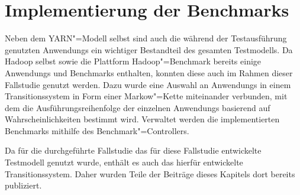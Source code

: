 \chapter{Implementierung der Benchmarks}
\label{ch:benchmarks}

Neben dem \gls{YARN}"=Modell selbst sind auch die während der Testausführung genutzten \glspl{Anwendung} ein wichtiger Bestandteil des gesamten Testmodells.
Da Hadoop selbst sowie die Plattform Hadoop"=Benchmark bereits einige \glspl{Anwendung} und Benchmarks enthalten, konnten diese auch im Rahmen dieser Fallstudie genutzt werden.
Dazu wurde eine Auswahl an \glspl{Anwendung} in einem Transitionssystem in Form einer Markow"=Kette miteinander verbunden, mit dem die Ausführungsreihenfolge der einzelnen \glspl{Anwendung} basierend auf Wahrscheinlichkeiten bestimmt wird.
Verwaltet werden die implementierten Benchmarks mithilfe des Benchmark"=Controllers.

Da für die durchgeführte Fallstudie \cite{Eberhardinger2018} das für diese Fallstudie entwickelte Testmodell genutzt wurde, enthält es auch das hierfür entwickelte Transitionssystem.
Daher wurden Teile der Beiträge dieses Kapitels dort bereits publiziert.





